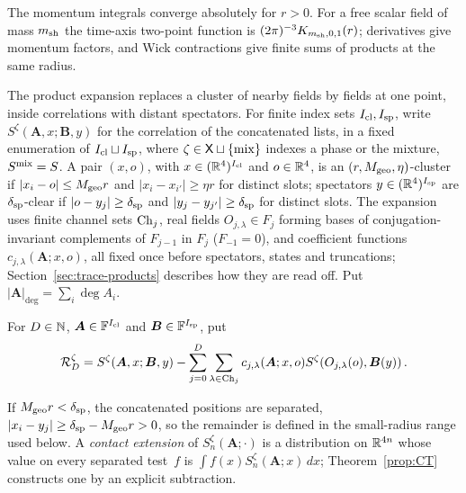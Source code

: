 The momentum integrals converge absolutely for $r>0$. For a free scalar field of mass $m_{\rm sh}$ the time-axis two-point function is $(2\pi)^{-3}K_{m_{\rm sh},0,1}(r)$; derivatives give momentum factors, and Wick contractions give finite sums of products at the same radius.

The product expansion replaces a cluster of nearby fields by fields at one point, inside correlations with distant spectators. For finite index sets $I_{\rm cl},I_{\rm sp}$, write $S^\zeta(\boldsymbol A,x;\boldsymbol B,y)$ for the correlation of the concatenated lists, in a fixed enumeration of $I_{\rm cl}\sqcup I_{\rm sp}$, where $\zeta\in\mathsf{X}\sqcup\{\mathrm{mix}\}$ indexes a phase or the mixture, $S^{\rm mix}=S$. A pair $(x,o)$, with $x\in(\mathbb{R}^4)^{I_{\rm cl}}$ and $o\in\mathbb{R}^4$, is an $(r,M_{\rm geo},\eta)$-cluster if $|x_i-o|\le M_{\rm geo}r$ and $|x_i-x_{i'}|\ge\eta r$ for distinct slots; spectators $y\in(\mathbb{R}^4)^{I_{\rm sp}}$ are $\delta_{\rm sp}$-clear if $|o-y_j|\ge\delta_{\rm sp}$ and $|y_j-y_{j'}|\ge\delta_{\rm sp}$ for distinct slots. The expansion uses finite channel sets $\mathrm{Ch}_{j}$, real fields $O_{j,\lambda}\in F_j$ forming bases of conjugation-invariant complements of $F_{j-1}$ in $F_j$ ($F_{-1}=0$), and coefficient functions $c_{j,\lambda}(\boldsymbol A;x,o)$, all fixed once before spectators, states and truncations; Section~\ref{sec:trace-products} describes how they are read off. Put $|\boldsymbol A|_{\deg}=\sum_i\deg A_i$.

\begin{definition}\label{def:D18}
For $D\in\mathbb{N}$, $\boldsymbol A\in\mathbb F^{I_{\rm cl}}$ and $\boldsymbol B\in\mathbb F^{I_{\rm sp}}$, put
\begin{equation*}
\mathcal R_D^\zeta=S^\zeta(\boldsymbol A,x;\boldsymbol B,y)-\sum_{j=0}^D\sum_{\lambda\in\mathrm{Ch}_{j}}c_{j,\lambda}(\boldsymbol A;x,o)S^\zeta(O_{j,\lambda}(o),\boldsymbol B(y))\,.
\end{equation*}
\end{definition}

If $M_{\rm geo}r<\delta_{\rm sp}$, the concatenated positions are separated, $|x_i-y_j|\ge\delta_{\rm sp}-M_{\rm geo}r>0$, so the remainder is defined in the small-radius range used below. A \emph{contact extension} of $S_n^\zeta(\boldsymbol A;\cdot)$ is a distribution on $\mathbb{R}^{4n}$ whose value on every separated test~$f$ is $\int f(x)S_n^\zeta(\boldsymbol A;x)\,dx$; Theorem~\ref{prop:CT} constructs one by an explicit subtraction.
